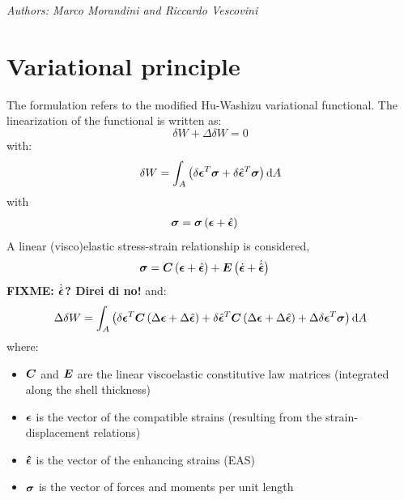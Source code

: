 \emph{Authors: Marco Morandini and Riccardo Vescovini}
\newcommand{ \fracd }[ 2 ]{ \frac{ \displaystyle{ #1 } }{ \displaystyle{ #2 }} }
\newcommand{ \fracdp }[ 2 ]{ \frac{ \displaystyle{ \partial #1 } }{ \displaystyle{ \partial #2 }} }
\newcommand{ \Rot }[ 1 ]{ \texttt{Rot} \plbr{ #1 } }
\newcommand{ \VecRot }[ 1 ]{ \texttt{VecRot} \plbr{ #1 } }
\newcommand{ \valxii }[ 0 ]{\plbr{ \T{ \xi }_{ i } } }
\newcommand{ \valxin }[ 0 ]{\plbr{ \T{ \xi }_{ n } } }
\newcommand{ \valxiA }[ 0 ]{\plbr{ \T{ \xi }_{ A } } }
\newcommand{ \valxio }[ 0 ]{\plbr{ \T{ \xi }_{ 0 } } }
\noindent


\section{Variational principle}
The formulation refers to the modified Hu-Washizu variational functional. The linearization of the functional is written as:
\begin{equation}
\delta W + \Delta \delta W = 0
\end{equation}
with:
\begin{equation}
\delta W = \int_A \left( 
\delta{\bm{\epsilon}}^T \bm{\sigma} + \delta \hat{\bm{\epsilon}}^T \bm{\sigma}
 \right) \text{d}A
\label{eq:deltaW}
\end{equation}
with
\begin{align}
	\bm{\sigma} &= \bm{\sigma}\left( \bm{\epsilon} + \hat{\bm{\epsilon}} \right)
\end{align}
A linear (visco)elastic stress-strain relationship is considered,
\begin{align}
	\bm{\sigma}
	&=
	\bm{C} \left( 
		\bm{\epsilon} + \hat{\bm{\epsilon}}
	 \right)
	+
	\bm{E} \left( 
		\dot{\bm{\epsilon}} + \dot{\hat{\bm{\epsilon}}}
	 \right)
\end{align}
\textbf{FIXME: $\dot{\hat{\bm{\epsilon}}}$? Direi di no!}
and:
\begin{equation}
\Delta \delta W = \int_A \left( 
\delta {\bm{\epsilon}} ^T  \bm{C} \left(  \Delta {\bm{\epsilon}}  + \Delta \hat{\bm{\epsilon}} \right) +
\delta \hat{\bm{\epsilon}} ^T  \bm{C} \left(  \Delta {\bm{\epsilon}}  + \Delta \hat{\bm{\epsilon}} \right) +
\Delta \delta { \bm{\epsilon} }^T \bm{\sigma}
 \right) \text{d}A
\label{eq:DeltadeltaW}
\end{equation}
where:
\begin{itemize}
\item $\bm{C}$ and $\bm{E}$ are the linear viscoelastic constitutive law matrices (integrated along the shell thickness)
\item $\bm{\epsilon}$ is the vector of the compatible strains (resulting from the strain-displacement relations)
\item $\bm{\hat{\epsilon}}$ is the vector of the enhancing strains (EAS)
\item $\bm{\sigma}$ is the vector of forces and moments per unit length
\end{itemize}
